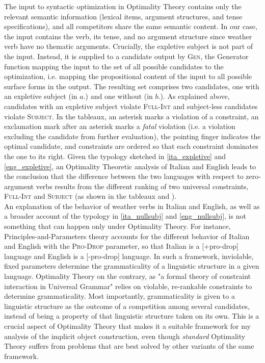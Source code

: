 The input to syntactic optimization in Optimality Theory contains only the relevant semantic information (lexical items, argument structures, and tense specifications), and all competitors share the same semantic content. In our case, the input contains the verb, its tense, and no argument structure since weather verb have no thematic arguments. Crucially, the expletive subject is not part of the input. Instead, it is supplied to a candidate output by \textsc{Gen}, the Generator function mapping the input to the set of all possible candidates to the optimization, i.e. mapping the propositional content of the input to all possible surface forms in the output. The resulting set comprises two candidates, one with an expletive subject (in $a.$) and one without (in $b.$). As explained above, candidates with an expletive subject violate \textsc{Full-Int} and subject-less candidates violate \textsc{Subject}. In the tableaux, an asterisk marks a violation of a constraint, an exclamation mark after an asterisk marks a \textit{fatal} violation (i.e. a violation excluding the candidate from further evaluation), the pointing finger indicates the optimal candidate, and constraints are ordered so that each constraint dominates the one to its right. Given the typology sketched in \ref{ita_expletive} and \ref{eng_expletive}, an Optimality Theoretic analysis of Italian and English leads to the conclusion that the difference between the two languages with respect to zero-argument verbs results from the different ranking of two universal constraints, \textsc{Full-Int} and \textsc{Subject} (as shown in the tableaux   and ).\\
An explanation of the behavior of weather verbs in Italian and English, as well as a broader account of the typology in \ref{ita_nullsubj} and \ref{eng_nullsubj}, is not something that can happen only under Optimality Theory. For instance, Principles-and-Parameters theory accounts for the different behavior of Italian and English with the \textsc{Pro-Drop} parameter, so that Italian is a [+pro-drop] language and English is a [-pro-drop] language. In such a framework, inviolable, fixed parameters determine the grammaticality of a linguistic structure in a given language. Optimality Theory on the contrary, as "a formal theory of constraint interaction in Universal Grammar" \parencite{legendre2001introduction} relies on violable, re-rankable constraints to determine grammaticality. Most importantly, grammaticality is given to a linguistic structure as the outcome of a competition among several candidates, instead of being a property of that linguistic structure taken on its own. This is a crucial aspect of Optimality Theory that makes it a suitable framework for my analysis of the implicit object construction, even though \textit{standard} Optimality Theory suffers from problems that are best solved by other variants of the same framework. %
